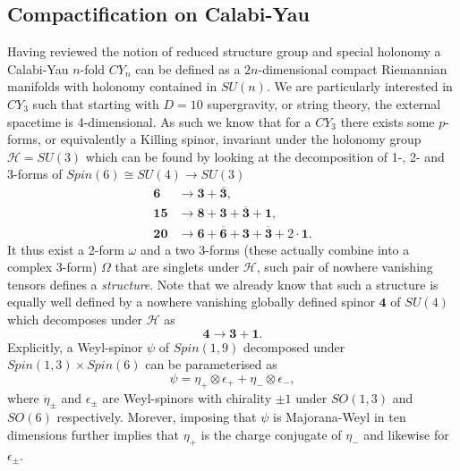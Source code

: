 \subsection{Compactification on Calabi-Yau}\label{sec:CalabiYau}
Having reviewed the notion of reduced structure group and special holonomy a Calabi-Yau $n$-fold $CY_{n}$ can be defined as a $2n$-dimensional compact Riemannian manifolds with holonomy contained in $SU(n)$\cite{Blumenhagen2013}. We are particularly interested in $CY_3$ such that starting with $D=10$ supergravity, or string theory, the external spacetime is 4-dimensional. As such we know that for a $CY_3$ there exists some $p$-forms, or equivalently a Killing spinor, invariant under the holonomy group $\mathscr{H}=SU(3)$ which can be found by looking at the decomposition of 1-, 2- and 3-forms of $Spin(6)\cong SU(4)\to SU(3)$
\begin{align*}
    \mathbf{6}&\to \mathbf{3}+\mathbf{\overbar{3}},\\
    \mathbf{15}&\to \mathbf{8}+\mathbf{3}+\overbar{\mathbf{3}}+\mathbf{1},\\
    \mathbf{20}&\to \mathbf{6}+\overbar{\mathbf{6}}+\mathbf{3}+\overbar{\mathbf{3}}+2\cdot\mathbf{1}.
\end{align*}
It thus exist a 2-form $\omega$ and a two 3-forms (these actually combine into a complex 3-form) $\Omega$ that are singlets under $\mathscr{H}$, such pair of nowhere vanishing tensors defines a \emph{structure}. Note that we already know that such a structure is equally well defined by a nowhere vanishing globally defined spinor $\mathbf{4}$ of $SU(4)$ which decomposes under $\mathscr{H}$ as 
\begin{equation}
    \mathbf{4}\to \mathbf{3}+\mathbf{1}.
\end{equation}
Explicitly, a Weyl-spinor $\psi$ of $Spin(1,9)$ decomposed under $Spin(1,3)\times Spin(6)$ can be parameterised as 
\begin{equation}
    \psi = \eta_+\otimes\epsilon_++\eta_-\otimes\epsilon_-,
\end{equation}
where $\eta_\pm$ and $\epsilon_\pm$ are Weyl-spinors with chirality $\pm 1$ under $SO(1,3)$ and $SO(6)$ respectively. Morever, imposing that $\psi$ is Majorana-Weyl in ten dimensions further implies that $\eta_+$ is the charge conjugate of $\eta_-$ and likewise for $\epsilon_\pm$.

